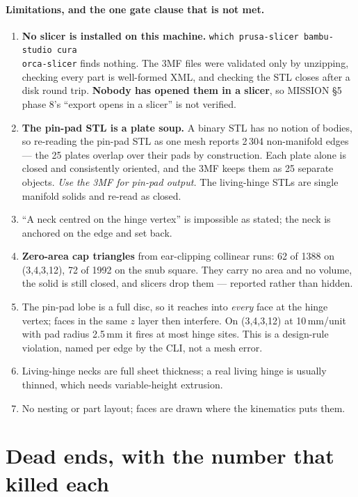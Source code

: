 \documentclass[10pt,a4paper]{article}
\newcommand{\fn}[1]{\nolinkurl{#1}}
\begin{document}
\paragraph{Limitations, and the one gate clause that is not met.}
\begin{enumerate}[nosep,leftmargin=6mm]
\item \textbf{No slicer is installed on this machine.} \fn{which prusa-slicer bambu-studio cura
orca-slicer} finds nothing. The 3MF files were validated only by unzipping, checking every part
is well-formed XML, and checking the STL closes after a disk round trip. \textbf{Nobody has
opened them in a slicer}, so MISSION \S5 phase 8's ``export opens in a slicer'' is not verified.
\item \textbf{The pin-pad STL is a plate soup.} A binary STL has no notion of bodies, so
re-reading the pin-pad STL as one mesh reports 2\,304 non-manifold edges --- the 25 plates
overlap over their pads by construction. Each plate alone is closed and consistently oriented,
and the 3MF keeps them as 25 separate objects. \emph{Use the 3MF for pin-pad output.} The
living-hinge STLs are single manifold solids and re-read as closed.
\item ``A neck centred on the hinge vertex'' is impossible as stated; the neck is anchored on
the edge and set back.
\item \textbf{Zero-area cap triangles} from ear-clipping collinear runs: 62 of 1388 on
(3,4,3,12), 72 of 1992 on the snub square. They carry no area and no volume, the solid is still
closed, and slicers drop them --- reported rather than hidden.
\item The pin-pad lobe is a full disc, so it reaches into \emph{every} face at the hinge vertex;
faces in the same $z$ layer then interfere. On (3,4,3,12) at 10\,mm/unit with pad radius 2.5\,mm
it fires at most hinge sites. This is a design-rule violation, named per edge by the CLI, not a
mesh error.
\item Living-hinge necks are full sheet thickness; a real living hinge is usually thinned, which
needs variable-height extrusion.
\item No nesting or part layout; faces are drawn where the kinematics puts them.
\end{enumerate}

\section{Dead ends, with the number that killed each}
\end{document}
